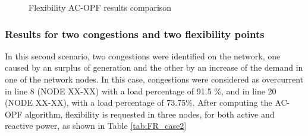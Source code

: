 \begin{figure}[htbp]
\centering     %
{}
\caption{Flexibility AC-OPF results comparison}
\label{fig:case1_fr}
\end{figure}


\subsubsection{Results for two congestions and two flexibility points}

In this second scenario, two congestions were identified on the network, one caused by an surplus of generation and the other by an increase of the demand in one of the network nodes. In this case, congestions were considered as overcurrent in line 8 (NODE XX-XX) with a load percentage of 91.5 \%, and in line 20 (NODE XX-XX), with a load percentage of 73.75\%. After computing the AC-OPF algorithm, flexibility is requested in three nodes, for both active and reactive power, as shown in Table \ref{tab:FR_case2}

